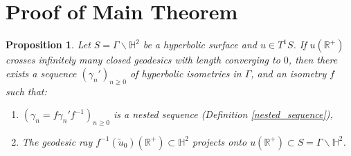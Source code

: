 \documentclass[a4paper,english,reqno]{amsart}
\newcommand{\R}{\mathbb{R}}
\renewcommand{\H}{\mathbb{H}}
\newtheorem{proposition}{Proposition}
\theoremstyle{definition}
\numberwithin{equation}{section}
\begin{document}
\section{Proof of Main Theorem}
\begin{proposition}\label{prop3}
	Let $S=\Gamma\backslash\H^2$ be a hyperbolic surface and $u\in T^1S$. If $u(\R^+)$ crosses infinitely many closed geodesics with length converging to $0$, then there exists a sequence $(\gamma_n')_{n\geq 0}$ of hyperbolic isometries in $\Gamma$, and an isometry $f$ such that:
	\begin{enumerate}
		\item $(\gamma_n=f\gamma_n'f^{-1})_{n\geq 0}$ is a nested sequence (Definition \ref{nested_sequence}),
		\item The geodesic ray $f^{-1}(\tilde u_0)(\R^+)\subset \H^2$ projects onto $u(\R^+)\subset S=\Gamma\backslash\H^2$.
	\end{enumerate}
\end{proposition}
\end{document}
